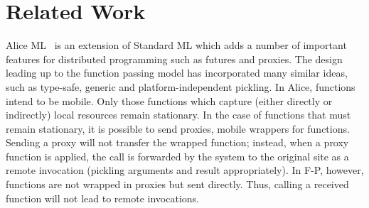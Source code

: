 \documentclass{jfp1}
\begin{document}
%
%



\section{Related Work}
\label{sec:related-work}

Alice ML~\cite{AliceML} is an extension of Standard ML which adds a number of
important features for distributed programming such as futures and proxies. The
design leading up to the function passing model has incorporated many similar
ideas, such as {type-safe}, generic and platform-independent pickling. In Alice,
functions intend to be mobile. Only those functions which capture (either
directly or indirectly) local resources remain stationary. In the case of
functions that must remain stationary, it is possible to send proxies, mobile
wrappers for functions. Sending a proxy will not transfer the wrapped function;
instead, when a proxy function is applied, the call is forwarded by the system
to the original site as a remote invocation (pickling arguments and result
appropriately). In F-P, however, functions are not wrapped in proxies but sent
directly. Thus, calling a received function will not lead to remote invocations.
\end{document}
